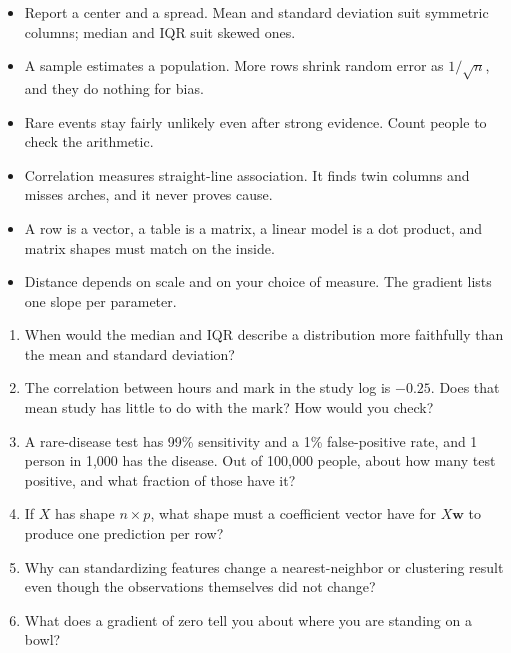 \begin{chapterrecap}
\begin{itemize}
  \item Report a center and a spread. Mean and standard deviation suit symmetric columns; median and IQR suit skewed ones.
  \item A sample estimates a population. More rows shrink random error as $1/\sqrt{n}$, and they do nothing for bias.
  \item Rare events stay fairly unlikely even after strong evidence. Count people to check the arithmetic.
  \item Correlation measures straight-line association. It finds twin columns and misses arches, and it never proves cause.
  \item A row is a vector, a table is a matrix, a linear model is a dot product, and matrix shapes must match on the inside.
  \item Distance depends on scale and on your choice of measure. The gradient lists one slope per parameter.
\end{itemize}
\end{chapterrecap}

\begin{quickcheck}
\begin{enumerate}
  \item When would the median and IQR describe a distribution more faithfully than the mean and standard deviation?
  \item The correlation between hours and mark in the study log is $-0.25$. Does that mean study has little to do with the mark? How would you check?
  \item A rare-disease test has 99\% sensitivity and a 1\% false-positive rate, and 1 person in 1,000 has the disease. Out of 100,000 people, about how many test positive, and what fraction of those have it?
  \item If $X$ has shape $n\times p$, what shape must a coefficient vector have for $X\bm{w}$ to produce one prediction per row?
  \item Why can standardizing features change a nearest-neighbor or clustering result even though the observations themselves did not change?
  \item What does a gradient of zero tell you about where you are standing on a bowl?
\end{enumerate}
\end{quickcheck}
